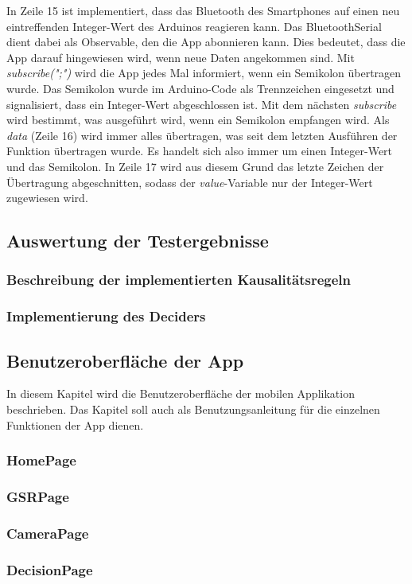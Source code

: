 In Zeile 15 ist implementiert, dass das Bluetooth des Smartphones auf einen neu eintreffenden Integer-Wert des Arduinos reagieren kann. Das BluetoothSerial dient dabei als Observable, den die App abonnieren kann. Dies bedeutet, dass die App darauf hingewiesen wird, wenn neue Daten angekommen sind. Mit \textit{subscribe(";")} wird die App jedes Mal informiert, wenn ein Semikolon übertragen wurde. Das Semikolon wurde im Arduino-Code als Trennzeichen eingesetzt und signalisiert, dass ein Integer-Wert abgeschlossen ist. Mit dem nächsten \textit{subscribe} wird bestimmt, was ausgeführt wird, wenn ein Semikolon empfangen wird. Als \textit{data} (Zeile 16) wird immer alles übertragen, was seit dem letzten Ausführen der Funktion übertragen wurde. Es handelt sich also immer um einen Integer-Wert und das Semikolon. In Zeile 17 wird aus diesem Grund das letzte Zeichen der Übertragung abgeschnitten, sodass der \textit{value}-Variable nur der Integer-Wert zugewiesen wird.

\subsection{Auswertung der Testergebnisse}
\subsubsection{Beschreibung der implementierten Kausalitätsregeln}
\subsubsection{Implementierung des Deciders}
\subsection{Benutzeroberfläche der App}
In diesem Kapitel wird die Benutzeroberfläche der mobilen Applikation beschrieben. Das Kapitel soll auch als Benutzungsanleitung für die einzelnen Funktionen der App dienen.
\subsubsection{HomePage}
\subsubsection{GSRPage}
\subsubsection{CameraPage}
\subsubsection{DecisionPage}
